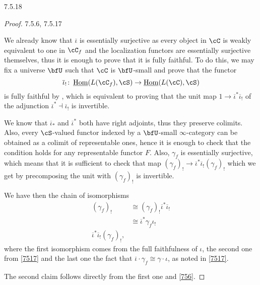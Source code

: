 \documentclass[a4paper,12pt]{scrartcl}
\begin{document}
\begin{prop}
  7.5.18
\end{prop}
\begin{proof}
  7.5.6, 7.5.17

  We already know that $\overline{\iota}$ is essentially surjective as every
  object in $\cC$ is weakly equivalent to one in $\cC_f$ and the localization
  functors are essentially surjective themselves, thus it is enough to prove
  that it is fully faithful. To do this, we may fix a universe $\bfU$ such that
  $\cC$ is $\bfU$-small and prove that the functor
  \[\overline{\iota}_!\colon\Home(L(\cC_f),\cS)\rightarrow\Home(L(\cC),\cS)\]
  is fully faithful by \cite[Prop.\ 6.1.15]{Cis19}, which is equivalent to
  proving that the unit map $1\rightarrow\overline{\iota}^*\overline{\iota}_!$
  of the adjunction $\overline{\iota}^*\dashv\overline{\iota}_!$ is invertible.

  We know that $\overline{\iota}_*$ and $\overline{\iota}^*$ both have right
  adjoints, thus they preserve colimits. Also, every $\cS$-valued functor
  indexed by a $\bfU$-small $\infty$-category can be obtained as a colimit of
  representable ones, hence it is enough to check that the condition holds for
  any representable functor $F$. Also, $\gamma_f$ is essentially surjective,
  which means that it is sufficient to check that map
  $(\gamma_f)_!\rightarrow\overline{\iota}^*\overline{\iota}_!(\gamma_f)_!$
  which we get by precomposing the unit with $(\gamma_f)_!$ is invertible.

  We have then the chain of isomorphisms
  \begin{align*}
    (\gamma_f)_! &\cong(\gamma_f)_!\overline{\iota}^*\overline{\iota}_! \\
                 &\cong\overline{\iota}^*\gamma_f\iota_! \\
                 \overline{\iota}^*\overline{\iota}_!(\gamma_f)_!,
  \end{align*}
  where the first isomorphism comes from the full faithfulness of $\iota$, the
  second one from \ref{7517} and the last one the fact that
  $\overline{\iota}\cdot\gamma_f\cong\gamma\cdot\iota$, as noted in \ref{7517}.

  The second claim follows directly from the first one and \ref{756}.
\end{proof}
\end{document}
